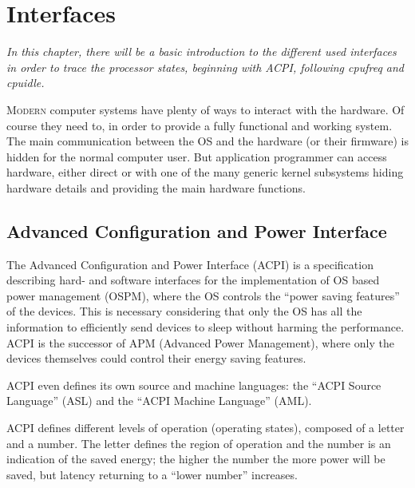 \renewcommand*{\dictumwidth}{0.5\textwidth}
\chapter{Interfaces}
\label{chap:interfaces}
\bigskip
\textit{In this chapter, there will be a basic introduction to the different used interfaces in order to trace the processor states, beginning with ACPI, following cpufreq and cpuidle.}

\bigskip
\lettrine[lines=2, lhang=.1, lraise=.1]{M}{odern} computer systems have plenty of ways to interact with the hardware. Of course they need to, in order to provide a fully functional and working system. The main communication between the OS and the hardware (or their firmware) is hidden for the normal computer user. But application programmer can access hardware, either direct or with one of the many generic kernel subsystems hiding hardware details and providing the main hardware functions.

%
%
\section{Advanced Configuration and Power Interface}
\label{sec:acpi}
The Advanced Configuration and Power Interface (ACPI) is a specification describing hard- and software interfaces for the implementation of OS based power management (OSPM), where the OS controls the ``power saving features'' of the devices. This is necessary considering that only the OS has all the information to efficiently send devices to sleep without harming the performance. ACPI is the successor of APM (Advanced Power Management), where only the devices themselves could control their energy saving features.

ACPI even defines its own source and machine languages: the ``ACPI Source Language'' (ASL) and the ``ACPI Machine Language'' (AML).

ACPI defines different levels of operation (operating states), composed of a letter and a number. The letter defines the region of operation and the number is an indication of the saved energy; the higher the number the more power will be saved, but latency returning to a ``lower number'' increases\cite{acpi}.\\[2em]

